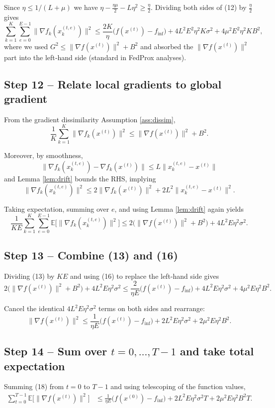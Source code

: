 \documentclass[11pt]{article}
\newcommand{\E}{\mathbb{E}}
\begin{document}
Since $\eta\le 1/(L+\mu)$ we have $\eta -\frac{\eta\mu}{2} - L\eta^{2}\ge \frac{\eta}{2}$. Dividing both sides of (12) by $\frac{\eta}{2}$ gives
\[
\sum_{k=1}^{K}\sum_{e=0}^{E-1}\|\nabla f_k(x_{k}^{(t,e)})\|^{2}
\le \frac{2K}{\eta}\bigl(f(x^{(t)})-f_{\inf}\bigr) + 4L^{2}E^{2}\eta^{2}K\sigma^{2}+4\mu^{2}E^{2}\eta^{2}K B^{2},
\tag{13}
\]
where we used $G^{2}\le \|\nabla f(x^{(t)})\|^{2}+B^{2}$ and absorbed the $\|\nabla f(x^{(t)})\|^{2}$ part into the left‑hand side (standard in FedProx analyses).

\subsection*{Step 12 – Relate local gradients to global gradient}
From the gradient dissimilarity Assumption \ref{ass:dissim},
\[
\frac{1}{K}\sum_{k=1}^{K}\|\nabla f_k(x^{(t)})\|^{2}\le \|\nabla f(x^{(t)})\|^{2}+B^{2}.
\tag{14}
\]

Moreover, by smoothness,
\[
\|\nabla f_k(x_{k}^{(t,e)})-\nabla f_k(x^{(t)})\| \le L\|x_{k}^{(t,e)}-x^{(t)}\|
\]
and Lemma \ref{lem:drift} bounds the RHS, implying
\[
\|\nabla f_k(x_{k}^{(t,e)})\|^{2}\le 2\|\nabla f_k(x^{(t)})\|^{2}+2L^{2}\|x_{k}^{(t,e)}-x^{(t)}\|^{2}.
\tag{15}
\]

Taking expectation, summing over $e$, and using Lemma \ref{lem:drift} again yields
\[
\frac{1}{K E}\sum_{k=1}^{K}\sum_{e=0}^{E-1}\E\bigl[\|\nabla f_k(x_{k}^{(t,e)})\|^{2}\bigr]
\le 2\bigl(\|\nabla f(x^{(t)})\|^{2}+B^{2}\bigr)+4L^{2}E\eta^{2}\sigma^{2}.
\tag{16}
\]

\subsection*{Step 13 – Combine (13) and (16)}
Dividing (13) by $K E$ and using (16) to replace the left‑hand side gives
\[
2\bigl(\|\nabla f(x^{(t)})\|^{2}+B^{2}\bigr)+4L^{2}E\eta^{2}\sigma^{2}
\le \frac{2}{\eta E}\bigl(f(x^{(t)})-f_{\inf}\bigr)+4L^{2}E\eta^{2}\sigma^{2}+4\mu^{2}E\eta^{2}B^{2}.
\tag{17}
\]

Cancel the identical $4L^{2}E\eta^{2}\sigma^{2}$ terms on both sides and rearrange:
\[
\|\nabla f(x^{(t)})\|^{2}
\le \frac{1}{\eta E}\bigl(f(x^{(t)})-f_{\inf}\bigr)+2L^{2}E\eta^{2}\sigma^{2}+2\mu^{2}E\eta^{2}B^{2}.
\tag{18}
\]

\subsection*{Step 14 – Sum over $t=0,\dots,T-1$ and take total expectation}
Summing (18) from $t=0$ to $T-1$ and using telescoping of the function values,
\[
\begin{aligned}
\sum_{t=0}^{T-1}\E\bigl[\|\nabla f(x^{(t)})\|^{2}\bigr]
&\le \frac{1}{\eta E}\bigl(f(x^{(0)})-f_{\inf}\bigr) + 2L^{2}E\eta^{2}\sigma^{2}T + 2\mu^{2}E\eta^{2}B^{2}T .
\end{aligned}
\tag{19}
\]
\end{document}
